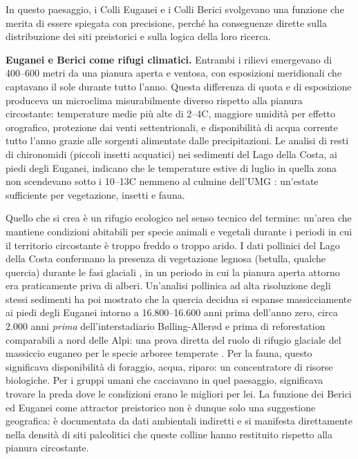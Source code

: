 In questo paesaggio, i Colli Euganei e i Colli Berici svolgevano una funzione che merita di essere spiegata con precisione, perché ha conseguenze dirette sulla distribuzione dei siti preistorici e sulla logica della loro ricerca.

\medskip
\noindent\textbf{Euganei e Berici come rifugi climatici.}
Entrambi i rilievi emergevano di 400--600 metri da una pianura aperta e ventosa, con esposizioni meridionali che captavano il sole durante tutto l'anno. Questa differenza di quota e di esposizione produceva un microclima misurabilmente diverso rispetto alla pianura circostante: temperature medie più alte di 2--4\textdegree C, maggiore umidità per effetto orografico, protezione dai venti settentrionali, e disponibilità di acqua corrente tutto l'anno grazie alle sorgenti alimentate dalle precipitazioni. Le analisi di resti di chironomidi (piccoli insetti acquatici) nei sedimenti del Lago della Costa, ai piedi degli Euganei, indicano che le temperature estive di luglio in quella zona non scendevano sotto i 10--13\textdegree C nemmeno al culmine dell'UMG \citep{samartin2016}: un'estate sufficiente per vegetazione, insetti e fauna.

Quello che si crea è un rifugio ecologico nel senso tecnico del termine: un'area che mantiene condizioni abitabili per specie animali e vegetali durante i periodi in cui il territorio circostante è troppo freddo o troppo arido. I dati pollinici del Lago della Costa confermano la presenza di vegetazione legnosa (betulla, qualche quercia) durante le fasi glaciali \citep{kaltenrieder2009}, in un periodo in cui la pianura aperta attorno era praticamente priva di alberi. Un'analisi pollinica ad alta risoluzione degli stessi sedimenti ha poi mostrato che la quercia decidua si espanse massicciamente ai piedi degli Euganei intorno a 16.800--16.600 anni prima dell'anno zero, circa 2.000 anni \textit{prima} dell'interstadiario Bølling-Allerød e prima di reforestation comparabili a nord delle Alpi: una prova diretta del ruolo di rifugio glaciale del massiccio euganeo per le specie arboree temperate \citep{boltshauser2024}. Per la fauna, questo significava disponibilità di foraggio, acqua, riparo: un concentratore di risorse biologiche. Per i gruppi umani che cacciavano in quel paesaggio, significava trovare la preda dove le condizioni erano le migliori per lei. La funzione dei Berici ed Euganei come attractor preistorico non è dunque solo una suggestione geografica: è documentata da dati ambientali indiretti e si manifesta direttamente nella densità di siti paleolitici che queste colline hanno restituito rispetto alla pianura circostante.

